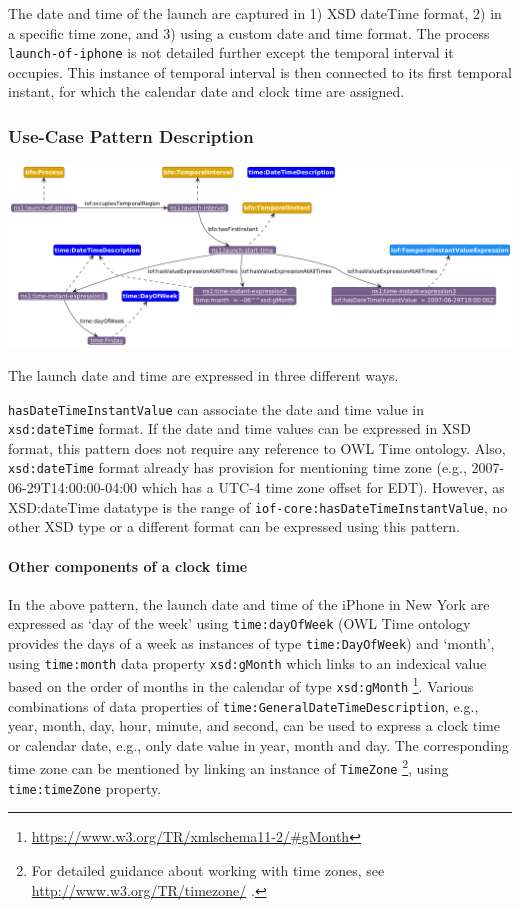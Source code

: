 The date and time of the launch are captured in 1) XSD dateTime format, 2) in a specific time zone, and 3) using a custom date and time format. The process \texttt{launch-of-iphone} is not detailed further except the temporal interval it occupies. This instance of temporal interval is then connected to its first temporal instant, for which the calendar date and clock time are assigned.   

\subsubsection*{Use-Case Pattern Description}

\includegraphics[scale=0.35]{scenarios/clock-time-calendar-date/images/uc1-dow-mn.png}

The launch date and time are expressed in three different ways.  

\texttt{hasDateTimeInstantValue} can associate the date and time value in \texttt{xsd:dateTime} format. If the date and time values can be expressed in XSD format, this pattern does not require any reference to OWL Time ontology. Also, \texttt{xsd:dateTime} format already has provision for mentioning time zone (e.g., 2007-06-29T14:00:00-04:00 which has a UTC-4 time zone offset for EDT). However, as XSD:dateTime datatype is the range of \texttt{iof-core:hasDateTimeInstantValue}, no other XSD type or a different format can be expressed using this pattern. 

\paragraph{Other components of a clock time \\}

In the above pattern, the launch date and time of the iPhone in New York are expressed as `day of the week' using \texttt{time:dayOfWeek} (OWL Time ontology provides the days of a week as instances of type \texttt{time:DayOfWeek})  and `month', using \texttt{time:month} data property \texttt{xsd:gMonth} which links to an indexical value based on the order of months in the calendar of type \texttt{xsd:gMonth} \footnote{\url{https://www.w3.org/TR/xmlschema11-2/\#gMonth}}.
Various combinations of data properties of \texttt{time:GeneralDateTimeDescription}, e.g.,  year, month, day, hour, minute, and second, can be used to express a clock time or calendar date, e.g., only date value in year, month and day. The corresponding time zone can be mentioned by linking an instance of \texttt{TimeZone} \footnote{For detailed guidance about working with time zones, see \url{http://www.w3.org/TR/timezone/} .}, using \texttt{time:timeZone} property.       


